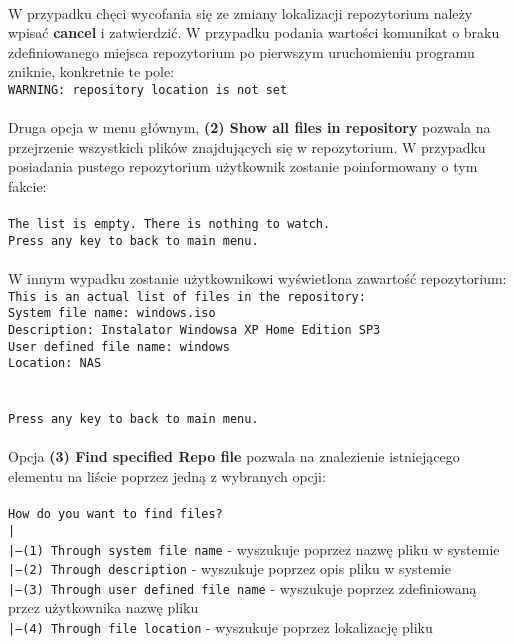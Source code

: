 \documentclass[10pt, a4paper]{article}
\begin{document}
\\
W przypadku chęci wycofania się ze zmiany lokalizacji repozytorium należy wpisać \textbf{cancel} i zatwierdzić. W przypadku podania wartości komunikat o braku zdefiniowanego miejsca repozytorium po pierwszym uruchomieniu programu zniknie, konkretnie te pole:\\
\texttt{WARNING: repository location is not set}\\
\\
Druga opcja w menu głównym, \textbf{(2) Show all files in repository} pozwala na przejrzenie wszystkich plików znajdujących się w repozytorium. W przypadku posiadania pustego repozytorium użytkownik zostanie poinformowany o tym fakcie:\\
\\
\texttt{The list is empty. There is nothing to watch.\\
Press any key to back to main menu.}\\
\\
W innym wypadku zostanie użytkownikowi wyświetlona zawartość repozytorium:\\
\texttt{This is an actual list of files in the repository:\\
System file name: windows.iso\\
Description: Instalator Windowsa XP Home Edition SP3\\
User defined file name: windows\\
Location: NAS\\
\\
\\
Press any key to back to main menu.}\\
\\
Opcja \textbf{(3) Find specified Repo file} pozwala na znalezienie istniejącego elementu na liście poprzez jedną z wybranych opcji:\\
\\
\texttt{How do you want to find files?}\\
\texttt{|}\\
\texttt{|---(1) Through system file name} - wyszukuje poprzez nazwę pliku w systemie\\
\texttt{|---(2) Through description} - wyszukuje poprzez opis pliku w systemie\\
\texttt{|---(3) Through user defined file name} - wyszukuje poprzez zdefiniowaną przez użytkownika nazwę pliku\\
\texttt{|---(4) Through file location} - wyszukuje poprzez lokalizację pliku\\
\end{document}
